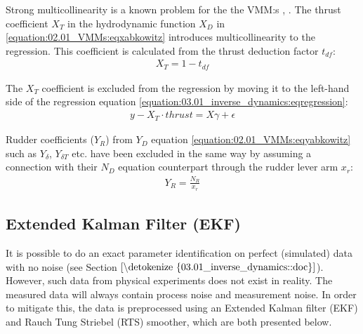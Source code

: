 \documentclass[review]{elsarticle}
\begin{document}
  
Strong multicollinearity is a known problem for the the VMM:s \cite{luo_parameter_2016}, \cite{wang_quantifying_2018}.
The thrust coefficient \(X_T\) in the hydrodynamic function \(X_D\) in \autoref{equation:02.01_VMMs:eqxabkowitz} introduces multicollinearity to the regression. This coefficient is calculated from the thrust deduction factor \(t_{df}\):
\begin{equation}\label{equation:03.01_inverse_dynamics:eqXthrust}
\begin{split}\displaystyle X_{T} = 1 - t_{df}\end{split}
\end{equation}
  
The \(X_T\) coefficient is excluded from the regression by moving it to the left-hand side of the regression equation \autoref{equation:03.01_inverse_dynamics:eqregression}:
\begin{equation}\label{equation:03.01_inverse_dynamics:eqexclude}
\begin{split}y-X_T \cdot thrust = X \gamma + \epsilon\end{split}
\end{equation}
  
Rudder coefficients (\(Y_R\)) from \(Y_D\) equation \autoref{equation:02.01_VMMs:eqyabkowitz} such as \(Y_{\delta}\), \(Y_{\delta T}\) etc. have been excluded in the same way by assuming a connection with their \(N_D\) equation counterpart through the rudder lever arm \(x_r\):
\begin{equation}\label{equation:03.01_inverse_dynamics:eqyr}
\begin{split}\displaystyle Y_{R} = \frac{N_{R}}{x_{r}}\end{split}
\end{equation}

\subsection{Extended Kalman Filter (EKF)}
\label{\detokenize{04.01_EK:extended-kalman-filter-ekf}}\label{\detokenize{04.01_EK::doc}}
  
It is possible to do an exact parameter identification on perfect (simulated) data with no noise (see Section \(\ref{\detokenize{03.01_inverse_dynamics::doc}}\)). However, such data from physical experiments does not exist in reality. The measured data will always contain process noise and measurement noise. In order to mitigate this, the data is preprocessed using an Extended Kalman filter (EKF) and Rauch Tung Striebel (RTS) smoother, which are both presented below.
\end{document}
